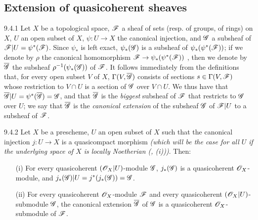 \documentclass[10pt,oneside]{book}
\begin{document}
\subsection{Extension of quasicoherent sheaves}
\label{1-schemes-9.4}        

\begin{env}{9.4.1}
\label{env-1.9.4.1}
Let
$X$ be a topological space, $\mathscr{F}$ a sheaf of sets (resp. of groups, of rings) on $X$, $U$
an open subset of $X$, $\psi:U\to X$ the canonical injection, and $\mathscr{G}$ a subsheaf of
$\mathscr{F}|U=\psi^*(\mathscr{F})$. Since $\psi_*$ is left exact, $\psi_*(\mathscr{G})$ is a subsheaf of
$\psi_*(\psi^*(\mathscr{F}))$; if we denote by $\rho$ the canonical homomorphism
$\mathscr{F}\to\psi_*(\psi^*(\mathscr{F}))$ , then we denote by $\overline{\mathscr{G}}$
the subsheaf $\rho^{-1}(\psi_*(\mathscr{G}))$ of $\mathscr{F}$. It follows immediately from the
definitions that, for every open subset $V$ of $X$, $\Gamma(V,\overline{\mathscr{G}})$ consists of
sections $s\in\Gamma(V,\mathscr{F})$ whose restriction to $V\cap U$ is a section of $\mathscr{G}$ over
$V\cap U$. We thus have that $\overline{\mathscr{G}}|U=\psi^*(\overline{\mathscr{G}})=\mathscr{G}$, and that
$\overline{\mathscr{G}}$ is the \emph{biggest} subsheaf of $\mathscr{F}$ that restricts to $\mathscr{G}$
over $U$; we say that $\overline{\mathscr{G}}$ is the \emph{canonical extension} of the subsheaf
$\mathscr{G}$ of $\mathscr{F}|U$ to a subsheaf of $\mathscr{F}$.
\end{env}

\begin{envs}[Proposition]{9.4.2}
\label{prop-1.9.4.2}
Let $X$ be a prescheme, $U$ an open subset of $X$ such that the canonical injection
$j:U\to X$ is a quasicompact morphism \emph{(which will be the case for \emph{all} $U$ if the
underlying space of $X$ is \emph{locally Noetherian} {\normalfont(, (i))})}.
Then:
\begin{itemize}
  \item[(i)] For every quasicoherent $(\mathscr{O}_X|U)$-module $\mathscr{G}$, $j_*(\mathscr{G})$
             is a quasicoherent $\mathscr{O}_X$-module, and
             $j_*(\mathscr{G})|U=j^*(j_*(\mathscr{G}))=\mathscr{G}$.
  \item[(ii)] For every quasicoherent $\mathscr{O}_X$-module $\mathscr{F}$ and every quasicoherent
              $(\mathscr{O}_X|U)$-submodule $\mathscr{G}$, the canonical extension
              $\overline{\mathscr{G}}$ of $\mathscr{G}$  is a
              quasicoherent $\mathscr{O}_X$-submodule of $\mathscr{F}$.
\end{itemize}
\end{envs}
\end{document}
